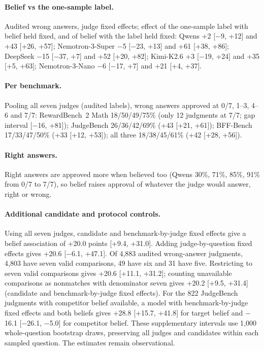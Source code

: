 \documentclass[11pt]{article}
\begin{document}
\paragraph{Belief vs the one-sample label.} Audited wrong answers, judge fixed effects; effect of the one-sample
label with belief held fixed, and of belief with the label held fixed: Qwens +2 [$-$9, +12] and +43 [+26, +57];
Nemotron-3-Super $-$5 [$-$23, +13] and +61 [+38, +86]; DeepSeek $-$15 [$-$37, +7] and +52 [+20, +82]; Kimi-K2.6
+3 [$-$19, +24] and +35 [+5, +63]; Nemotron-3-Nano $-$6 [$-$17, +7] and +21 [+4, +37].

\paragraph{Per benchmark.} Pooling all seven judges (audited labels), wrong answers approved at 0/7, 1--3, 4--6
and 7/7: RewardBench~2 Math 18/50/49/75\% (only 12 judgments at 7/7; gap interval [$-$16, +81]); JudgeBench
26/36/42/69\% (+43 [+21, +61]); BFF-Bench 17/33/47/50\% (+33 [+12, +53]); all three 18/38/45/61\% (+42 [+28, +56]).

\paragraph{Right answers.} Right answers are approved more when believed too (Qwens 30\%, 71\%, 85\%, 91\% from
0/7 to 7/7), so belief raises approval of whatever the judge would answer, right or wrong.

\paragraph{Additional candidate and protocol controls.}
Using all seven judges, candidate and benchmark-by-judge fixed effects give a belief association of
+20.0 points [+9.4, +31.0]. Adding judge-by-question fixed effects gives +20.6 [$-$6.1, +47.1].
Of 4,883 audited wrong-answer judgments, 4,803 have seven valid comparisons, 49 have six and 31 have five.
Restricting to seven valid comparisons gives +20.6 [+11.1, +31.2]; counting unavailable comparisons as
nonmatches with denominator seven gives +20.2 [+9.5, +31.4] (candidate and benchmark-by-judge fixed effects).
For the 822 JudgeBench judgments with competitor belief available, a model with benchmark-by-judge fixed
effects and both beliefs gives +28.8 [+15.7, +41.8] for target belief and $-$16.1 [$-$26.1, $-$5.0] for
competitor belief. These supplementary intervals use 1,000 whole-question bootstrap draws, preserving
all judges and candidates within each sampled question. The estimates remain observational.
\end{document}

